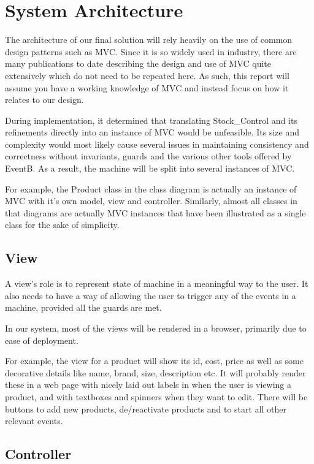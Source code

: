 \documentclass[a4paper]{article}
\begin{document}
\pagebreak
\section{System Architecture}

The architecture of our final solution will rely heavily on the use of common design patterns such as MVC. Since it is so widely used in industry, there are many publications to date describing the design and use of MVC quite extensively which do not need to be repeated here. As such, this report will assume you have a working knowledge of MVC and instead focus on how it relates to our design.

During implementation, it determined that translating Stock\_Control and its refinements directly into an instance of MVC would be unfeasible. Its size and complexity would most likely cause several issues in maintaining consistency and correctness without invariants, guards and the various other tools offered by EventB. As a result, the machine will be split into several instances of MVC.

For example, the Product class in the class diagram is actually an instance of MVC with it’s own model, view and controller. Similarly, almost all classes in that diagrams are actually MVC instances that have been illustrated as a single class for the sake of simplicity.

\subsection{View}

A view’s role is to represent state of machine in a meaningful way to the user. It also needs to have a way of allowing the user to trigger any of the events in a machine, provided all the guards are met.

In our system, most of the views will be rendered in a browser, primarily due to ease of deployment.

For example, the view for a product will show its id, cost, price as well as some decorative details like name, brand, size, description etc. It will probably render these in a web page with nicely laid out labels in when the user is viewing a product, and with textboxes and spinners when they want to edit. There will be buttons to add new products, de/reactivate products and to start all other relevant events. 

\subsection{Controller}
\end{document}
